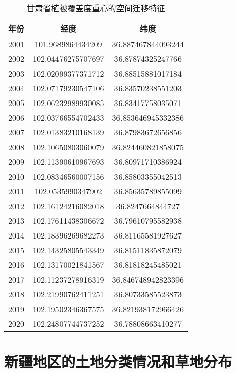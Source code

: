 \documentclass[AutoFakeBold]{LZUThesis-PgD&PhD}
\begin{document}
        \begin{table}[H]
            \centering
\begin{tabular}{|c|c|c|}
    \hline
    年份 & 经度 & 纬度 \\
    \hline
    2001 & 101.9689864434209 & 36.887467844093244 \\
    2002 & 102.04476275707697 & 36.87874325247766 \\
    2003 & 102.02099377371712 & 36.88515881017184 \\
    2004 & 102.07179230547106 & 36.83570238551203 \\
    2005 & 102.06232989930085 & 36.83417758035071 \\
    2006 & 102.03766554702433 & 36.853646945332386 \\
    2007 & 102.01383210168139 & 36.87983672656856 \\
    2008 & 102.10650803060079 & 36.824460821858075 \\
    2009 & 102.11390610967693 & 36.80971710386924 \\
    2010 & 102.08346560007156 & 36.85803355042513 \\
    2011 & 102.0535990347902 & 36.85635789855099 \\
    2012 & 102.16124216082018 & 36.8247664844727 \\
    2013 & 102.17611438306672 & 36.79610795582938 \\
    2014 & 102.18396269682273 & 36.81165581927627 \\
    2015 & 102.14325805543349 & 36.81511835872079 \\
    2016 & 102.13170021841567 & 36.81818245485021 \\
    2017 & 102.11237278916319 & 36.846748942823396 \\
    2018 & 102.21990762411251 & 36.80733585523873 \\
    2019 & 102.19502346367575 & 36.821938172966426 \\
    2020 & 102.24807744737252 & 36.78808663410277 \\
    \hline
        
\end{tabular}
\caption{甘肃省植被覆盖度重心的空间迁移特征}
        \end{table}


        \section{新疆地区的土地分类情况和草地分布}
\end{document}
